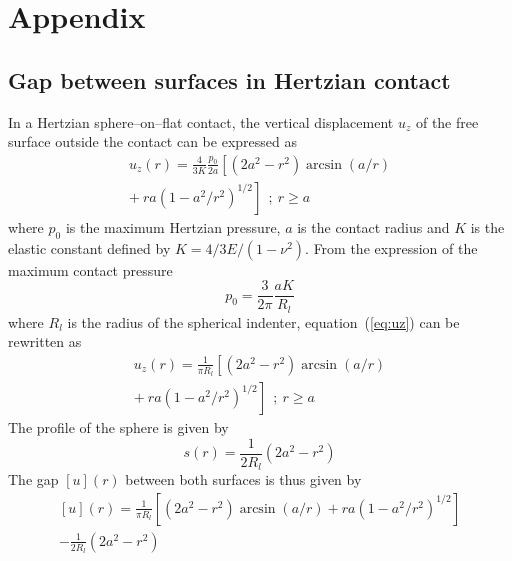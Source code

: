 \documentclass[pre,groupedaddress,showkeys,showpacs,twocolumn]{revtex4}
\begin{document}
\section*{Appendix}
\renewcommand{\thesubsection}{\Alph{subsection}}
\subsection{Gap between surfaces in Hertzian contact}
In a Hertzian sphere--on--flat contact, the vertical displacement $u_z$ of the free surface outside the contact can be expressed as \cite{Johnson1985a}
%
\begin{equation}
	\begin{split}
		u_z(r)=\frac{4}{3K}\frac{p_0}{2a} \left[ \left(2a^2-r^2 \right)\arcsin(a/r)\right. \\
		\left. +\:ra\left(1-a^2/r^2 \right)^{1/2}\right]\:\:; \: r\geq a
		\label{eq:uz}
	\end{split}
\end{equation}
%
where $p_0$ is the maximum Hertzian pressure, $a$ is the contact radius and $K$ is the elastic constant defined by $K=4/3 E/(1-\nu^2)$. From the expression of the maximum contact pressure
%
\begin{equation}
	p_0=\frac{3}{2\pi}\frac{aK}{R_l}
\end{equation}
%
where $R_l$ is the radius of the spherical indenter, equation~(\ref{eq:uz}) can be rewritten as
%
\begin{equation}
	\begin{split}
		u_z \left( r \right)=\frac{1}{\pi R_l}\left[ \left(2a^2-r^2 \right)\arcsin(a/r) \right. \\
		\left. +\:ra\left(1-a^2/r^2 \right)^{1/2}\right]\:\:; \: r\geq a
	\end{split}
\end{equation}
%
The profile of the sphere is given by
\begin{equation}
	s(r)=\frac{1}{2R_l}\left(2a^2-r^2 \right)
\end{equation}
%
The gap $\left[ u \right] \left( r \right)$ between both surfaces is thus given by
\begin{equation}
	\begin{split}
		\left[ u \right] \left( r \right)=\frac{1}{\pi R_l}\left[ \left(2a^2-r^2 \right)\arcsin(a/r)+ra\left(1-a^2/r^2 \right)^{1/2}\right] \\
		-\frac{1}{2R_l}\left(2a^2-r^2 \right)
	\end{split}
	\label{eq:ur}
\end{equation}
\end{document}
